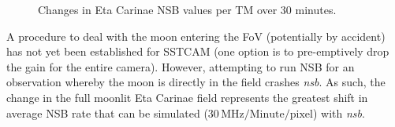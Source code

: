 \begin{figure}[ht]
\begin{minipage}{\linewidth}\centering
{}
\caption{Changes in Eta Carinae NSB values per TM over 30 minutes.}
\label{fig:30minsetacarTM}
\end{minipage}
\end{figure} 
A procedure to deal with the moon entering the FoV (potentially by accident) has not yet been established for SSTCAM (one option is to pre-emptively drop the gain for the entire camera). However, attempting to run NSB for an observation whereby the moon is directly in the field crashes \textit{nsb}. As such, the change in the full moonlit Eta Carinae field represents the greatest shift in average NSB rate that can be simulated ($\mathrm{30\,MHz/Minute/pixel}$) with \textit{nsb}.

